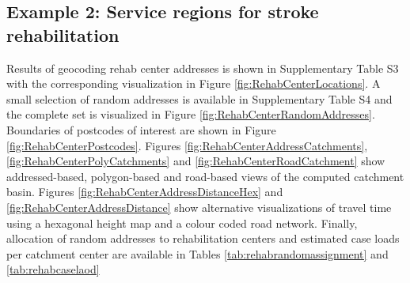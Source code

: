 \documentclass[utf8]{frontiersHLTH}
\begin{document}
\subsection{Example 2: Service regions for stroke rehabilitation} Results of geocoding rehab center addresses is shown in Supplementary Table S3 with the corresponding visualization in Figure \ref{fig:RehabCenterLocations}. A small selection of random addresses is available in Supplementary Table S4 and the complete set is visualized in Figure \ref{fig:RehabCenterRandomAddresses}. Boundaries of postcodes of interest are shown in Figure \ref{fig:RehabCenterPostcodes}. Figures \ref{fig:RehabCenterAddressCatchments}, \ref{fig:RehabCenterPolyCatchments} and \ref{fig:RehabCenterRoadCatchment} show addressed-based, polygon-based and road-based views of the computed catchment basin. Figures \ref{fig:RehabCenterAddressDistanceHex} and \ref{fig:RehabCenterAddressDistance} show alternative visualizations of travel time using a hexagonal height map and a colour coded road network. Finally, allocation of random addresses to rehabilitation centers and estimated case loads per catchment center are available in Tables \ref{tab:rehabrandomassignment} and \ref{tab:rehabcaselaod} 
\end{document}
